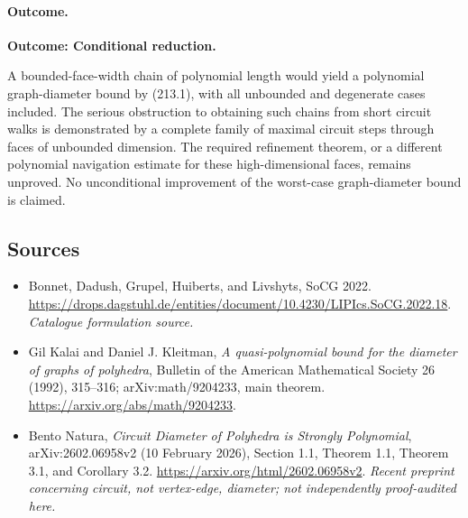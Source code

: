 \documentclass[11pt,a4paper]{article}
\begin{document}
\paragraph{Outcome.}
\textbf{Outcome: Conditional reduction.}

A bounded-face-width chain of polynomial length would yield a polynomial
graph-diameter bound by (213.1), with all unbounded and degenerate cases
included. The serious obstruction to obtaining such chains from short
circuit walks is demonstrated by a complete family of maximal circuit steps
through faces of unbounded dimension. The required refinement theorem, or
a different polynomial navigation estimate for these high-dimensional
faces, remains unproved. No unconditional improvement of the worst-case
graph-diameter bound is claimed.
\subsection{Sources}
\begin{itemize}\raggedright
\item[\textnormal{[S1]}]\hypertarget{source:statement:1}{} Bonnet, Dadush, Grupel, Huiberts, and Livshyts, SoCG 2022.
\url{https://drops.dagstuhl.de/entities/document/10.4230/LIPIcs.SoCG.2022.18}.
{\small\textit{Catalogue formulation source.}}
\item[\textnormal{[E1]}]\hypertarget{extra:statement:1}{} Gil Kalai and Daniel J. Kleitman,
\emph{A quasi-polynomial bound for the diameter of graphs of polyhedra},
Bulletin of the American Mathematical Society 26 (1992), 315--316;
arXiv:math/9204233, main theorem.
\url{https://arxiv.org/abs/math/9204233}.
\item[\textnormal{[E2]}]\hypertarget{extra:statement:2}{} Bento Natura,
\emph{Circuit Diameter of Polyhedra is Strongly Polynomial},
arXiv:2602.06958v2 (10 February 2026), Section 1.1, Theorem 1.1,
Theorem 3.1, and Corollary 3.2.
\url{https://arxiv.org/html/2602.06958v2}.
{\small\textit{Recent preprint concerning circuit, not vertex-edge, diameter; not independently proof-audited here.}}
\end{itemize}
\end{document}
